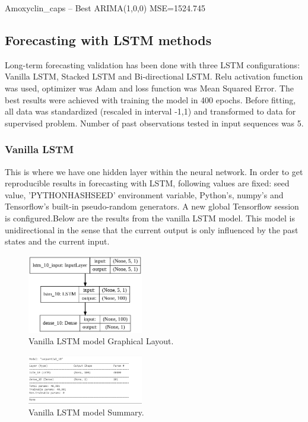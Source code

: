 \documentclass[12pt]{report}
\begin{document}
Amoxyclin\_caps – Best ARIMA(1,0,0) MSE=1524.745


\subsection{Forecasting with LSTM methods}

Long-term forecasting validation has been done with three LSTM configurations: Vanilla LSTM, Stacked LSTM and Bi-directional LSTM. Relu activation function was used, optimizer was Adam and loss function was Mean Squared Error. The best results were achieved with training the model in 400 epochs. Before fitting, all data was standardized (rescaled in interval -1,1) and transformed to data for supervised problem.
Number of past observations tested in input sequences was 5.

\subsubsection{Vanilla LSTM}
This is where we have one hidden layer within the neural network.
In order to get reproducible results in forecasting with LSTM, following values are fixed: seed value, 'PYTHONHASHSEED' environment variable, Python's, numpy's and Tensorflow's built-in pseudo-random generators. A new global Tensorflow session is configured.Below are the results from the vanilla LSTM model.
This model is unidirectional in the sense that the current output is only influenced by the past states and the current input.
\begin{figure}[H]%
  \begin {center}
  \includegraphics[width=0.45\textwidth]{dia.png}
  \caption{Vanilla LSTM model Graphical Layout.}
  \label{fig:ecg}
  \end {center}
\end{figure}

\begin{figure}[H]%
  \begin {center}
  \includegraphics[width=0.45\textwidth]{VanillaSummary.png}
  \caption{Vanilla LSTM model Summary.}
  \label{fig:ecg}
  \end {center}
\end{figure}
  
\end{document}
